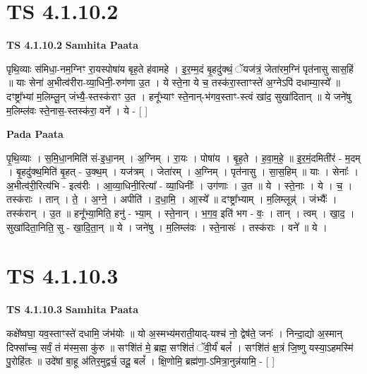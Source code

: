 \documentclass[17pt]{extarticle}
\begin{document}

\section{ TS 4.1.10.2 }

\textbf{TS 4.1.10.2 } \newline
\textbf{Samhita Paata} \newline

पृथि॒व्याः स॑मिधा॒-नम॒ग्निꣳ रा॒यस्पोषा॑य बृह॒ते ह॑वामहे । इ॒र॒म्म॒दं बृ॒हदु॑क्थं॒ ॅयज॑त्रं॒ जेता॑रम॒ग्निं पृत॑नासु सास॒हिं ॥ याः सेना॑ अ॒भीत्व॑रीरा-व्या॒धिनी॒-रुग॑णा उ॒त । ये स्ते॒ना ये च॒ तस्क॑रा॒स्ताꣳस्ते॑ अ॒ग्नेऽपि॑ दधाम्या॒स्ये᳚ ॥ दꣳष्ट्रा᳚भ्यां म॒लिम्लू॒न् जंभ्यै॒-स्तस्क॑राꣳ उ॒त । हनू᳚भ्याꣳ स्ते॒नान्-भ॑गव॒स्ताꣳ-स्त्वं खा॑द॒ सुखा॑दितान् ॥ ये जने॑षु म॒लिम्ल॑वः स्ते॒नास॒-स्तस्क॑रा॒ वने᳚ । ये - [  ] \newline

\textbf{Pada Paata} \newline

पृ॒थि॒व्याः । स॒मि॒धा॒नमिति॑ सं-इ॒धा॒नम् । अ॒ग्निम् । रा॒यः । पोषा॑य । बृ॒ह॒ते । ह॒वा॒म॒हे॒ ॥ इ॒र॒मं॒दमिती॑रं - म॒दम् । बृ॒हदु॑क्थ॒मिति॑ बृ॒हत् - उ॒क्थ॒म् । यज॑त्रम् । जेता॑रम् । अ॒ग्निम् । पृत॑नासु । सा॒स॒हिम् ॥ याः । सेनाः᳚ । अ॒भीत्व॑री॒रित्य॑भि - इत्व॑रीः । आ॒व्या॒धिनी॒रित्या᳚ - व्या॒धिनीः᳚ । उग॑णाः । उ॒त ॥ ये । स्ते॒नाः । ये । च॒ । तस्क॑राः । तान् । ते॒ । अ॒ग्ने॒ । अपीति॑ । द॒धा॒मि॒ । आ॒स्ये᳚ ॥ दꣳष्ट्रा᳚भ्याम् । म॒लिम्लून्न्॑ । जंभ्यैः᳚ । तस्क॑रान् । उ॒त ॥ हनू᳚भ्या॒मिति॒ हनु॑ - भ्या॒म् । स्ते॒नान् । भ॒ग॒व॒ इति॑ भग - वः॒ । तान् । त्वम् । खा॒द॒ । सुखा॑दिता॒निति॒ सु - खा॒दि॒ता॒न् ॥ ये । जने॑षु । म॒लिम्ल॑वः । स्ते॒नासः॑ । तस्क॑राः । वने᳚ ॥ ये ।  \newline





\section{ TS 4.1.10.3 }

\textbf{TS 4.1.10.3 } \newline
\textbf{Samhita Paata} \newline

कक्षे᳚ष्वघा॒ यव॒स्ताꣳस्ते॑ दधामि॒ जंभ॑योः ॥ यो अ॒स्मभ्य॑मराती॒याद्-यश्च॑ नो॒ द्वेष॑ते॒ जनः॑ । निन्दा॒द्यो अ॒स्मान् दिफ्सा᳚च्च॒ सर्वं॒ तं म॑स्म॒सा कु॑रु ॥ सꣳशि॑तं मे॒ ब्रह्म॒ सꣳशि॑तं ॅवी॒र्यं॑ बलं᳚ । सꣳशि॑तं क्ष॒त्रं जि॒ष्णु यस्या॒ऽहमस्मि॑ पु॒रोहि॑तः ॥ उदे॑षां बा॒हू अ॑तिर॒मुद्वर्च॒ उदू॒ बलं᳚ । क्षि॒णोमि॒ ब्रह्म॑णा॒-ऽमित्रा॒नुन्न॑यामि॒ - [  ] \newline
\end{document}
